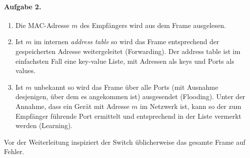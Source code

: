 \documentclass{article}
\begin{document}
\paragraph{Aufgabe 2.}
 
\begin{enumerate}[label=(\arabic*)]
    \item Die MAC-Adresse $m$ des Empfängers wird aus dem Frame ausgelesen.
    \item Ist $m$ im internen \emph{address table} so wird das Frame entsprechend der gespeicherten Adresse weitergeleitet (Forwarding). Der address table ist im einfachsten Fall eine key-value Liste, mit Adressen als keys und Ports als values.
    \item Ist $m$ unbekannt so wird das Frame über alle Ports (mit Ausnahme desjenigen, über dem es angekommen ist) ausgesendet (Flooding). Unter der Annahme, dass ein Gerät mit Adresse $m$ im Netzwerk ist, kann so der zum Empfänger führende Port ermittelt und entsprechend in der Liste vermerkt werden (Learning). 
\end{enumerate}

Vor der Weiterleitung inspiziert der Switch üblicherweise das gesamte Frame auf Fehler. 
\end{document}

